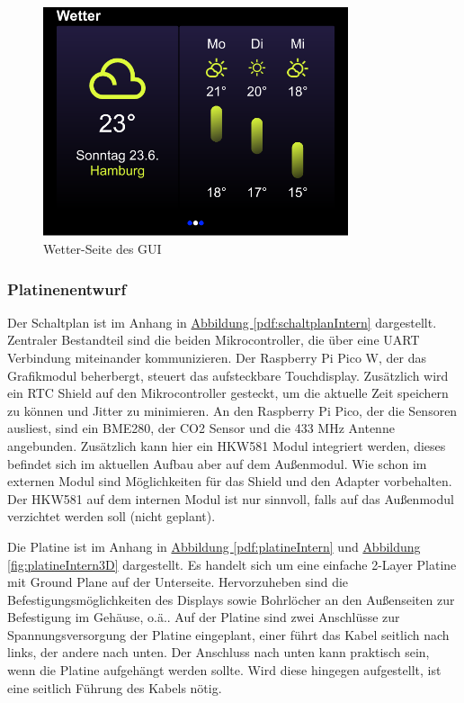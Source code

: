 \documentclass[a4paper,11pt]{article}
\newcounter{subsubsubsection}[subsubsection]
\begin{document}
\begin{figure}[H]
	\centering
	\includegraphics[width=0.8\textwidth]{Weather}
	\caption{Wetter-Seite des GUI}
	\label{fig:gui-overview}
\end{figure}

\subsubsection{Platinenentwurf}
\label{subsubsub:platinenentwurfExtern} 

\label{subsubsubsub:schaltplanExtern}

Der Schaltplan ist im Anhang in \hyperref[pdf:schaltplanIntern]{Abbildung \ref{pdf:schaltplanIntern}} dargestellt. Zentraler Bestandteil sind die beiden Mikrocontroller, 
die über eine UART Verbindung miteinander kommunizieren. Der Raspberry Pi Pico W, der das Grafikmodul beherbergt, steuert das aufsteckbare Touchdisplay. Zusätzlich wird
ein RTC Shield auf den Mikrocontroller gesteckt, um die aktuelle Zeit speichern zu können und Jitter zu minimieren. 
An den Raspberry Pi Pico, der die Sensoren ausliest, sind ein BME280, der CO2 Sensor und die 433 MHz Antenne angebunden. Zusätzlich kann hier ein HKW581 Modul integriert werden, 
dieses befindet sich im aktuellen Aufbau aber auf dem Außenmodul. Wie schon im externen Modul sind Möglichkeiten für das Shield und den Adapter vorbehalten. 
Der HKW581 auf dem internen Modul ist nur sinnvoll, falls auf das Außenmodul verzichtet werden soll (nicht geplant).

\label{subsubsubsub:platineExtern}

Die Platine ist im Anhang in \hyperref[pdf:platineIntern]{Abbildung \ref{pdf:platineIntern}} und \hyperref[fig:platineIntern3D]{Abbildung \ref{fig:platineIntern3D}} dargestellt. Es handelt sich um eine einfache 2-Layer Platine mit Ground Plane
auf der Unterseite. Hervorzuheben sind die Befestigungsmöglichkeiten des Displays sowie Bohrlöcher an den Außenseiten zur Befestigung im Gehäuse, o.ä..
Auf der Platine sind zwei Anschlüsse zur Spannungsversorgung der Platine eingeplant, einer führt das Kabel seitlich nach links, der andere nach unten. 
Der Anschluss nach unten kann praktisch sein, wenn die Platine aufgehängt werden sollte. Wird diese hingegen aufgestellt, ist eine seitlich Führung des Kabels nötig. 
\end{document}

